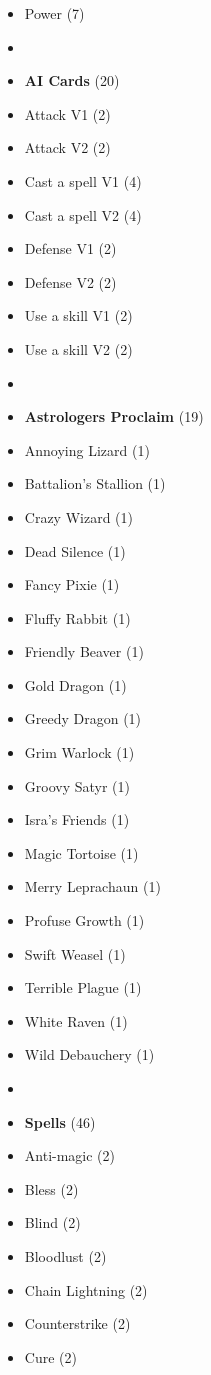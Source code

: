 \begin{multicols*}{3}
\begin{itemize}[leftmargin=0pt, label={}, noitemsep, noitemsep]
  \item Power (7)
  \item
  \item \textbf{AI Cards} (20)
  \item Attack V1 (2)
  \item Attack V2 (2)
  \item Cast a spell V1 (4)
  \item Cast a spell V2 (4)
  \item Defense V1 (2)
  \item Defense V2 (2)
  \item Use a skill V1 (2)
  \item Use a skill V2 (2)
  \item
  \item \textbf{Astrologers Proclaim} (19)
  \item Annoying Lizard (1)
  \item Battalion's Stallion (1)
  \item Crazy Wizard (1)
  \item Dead Silence (1)
  \item Fancy Pixie (1)
  \item Fluffy Rabbit (1)
  \item Friendly Beaver (1)
  \item Gold Dragon (1)
  \item Greedy Dragon (1)
  \item Grim Warlock (1)
  \item Groovy Satyr (1)
  \item Isra's Friends (1)
  \item Magic Tortoise (1)
  \item Merry Leprachaun (1)
  \item Profuse Growth (1)
  \item Swift Weasel (1)
  \item Terrible Plague (1)
  \item White Raven (1)
  \item Wild Debauchery (1)
  \item
  \item \textbf{Spells} (46)
  \item Anti-magic (2)
  \item Bless (2)
  \item Blind (2)
  \item Bloodlust (2)
  \item Chain Lightning (2)
  \item Counterstrike (2)
  \item Cure (2)

\end{itemize}
\end{multicols*}
